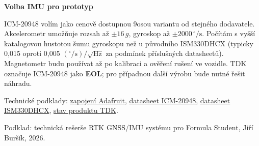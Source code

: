 \documentclass[FM,SP,oneside]{tulthesis}
\begin{document}
\vspace{0.4em}
{\sffamily\bfseries\color{tulFM}Volba IMU pro prototyp}
\par\vspace{0.2em}
ICM-20948 volím jako cenově dostupnou 9osou variantu od stejného dodavatele.
Akcelerometr umožňuje rozsah až $\pm16\,g$, gyroskop až $\pm2000\,{}^{\circ}/\mathrm{s}$.
Počítám s vyšší katalogovou hustotou šumu gyroskopu než u původního ISM330DHCX
(typicky 0,015 oproti 0,005 $({}^{\circ}/\mathrm{s})/\sqrt{\mathrm{Hz}}$ za podmínek příslušných datasheetů).
Magnetometr budu používat až po kalibraci a ověření rušení ve vozidle.
TDK označuje ICM-20948 jako \textbf{EOL}; pro případnou další výrobu bude nutné řešit náhradu.

\vspace{0.3em}
{\scriptsize\color{black!62}
Technické podklady:
\href{https://learn.adafruit.com/adafruit-tdk-invensense-icm-20948-9-dof-imu/pinouts}{zapojení Adafruit},
\href{https://product.tdk.com/system/files/dam/doc/product/sensor/mortion-inertial/imu/data_sheet/ds-000189-icm-20948-v1.5.pdf}{datasheet ICM-20948},
\href{https://www.st.com/resource/en/datasheet/ism330dhcx.pdf}{datasheet ISM330DHCX},
\href{https://www.invensense.tdk.com/en-us/products/9-axis/icm-20948}{stav produktu TDK}.
}

\vspace{0.35em}
{\scriptsize\color{black!62}
Podklad: technická rešerše RTK GNSS/IMU systému pro Formula Student, Jiří Buršík, 2026.
}
\end{document}
